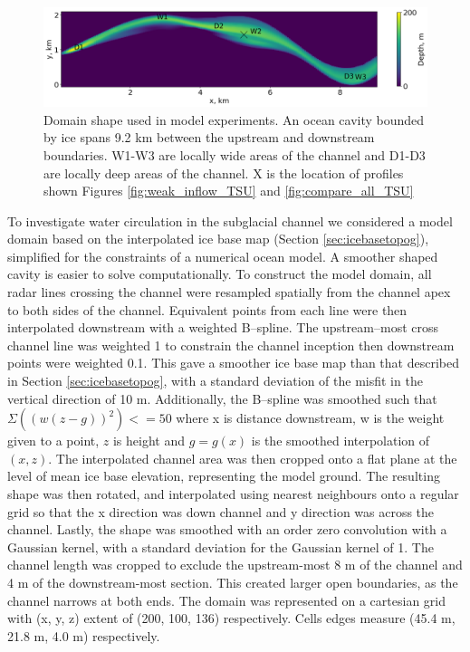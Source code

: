 \begin{figure}[!ht]
\centering
\includegraphics[width=1\textwidth]{chapters/4/domain.png}
\caption[Domain]{Domain shape used in model experiments. An ocean cavity bounded by ice spans 9.2 km between the upstream and downstream boundaries. W1-W3 are locally wide areas of the channel and D1-D3 are locally deep areas of the channel. X is the location of profiles shown Figures \ref{fig:weak_inflow_TSU} and \ref{fig:compare_all_TSU} }
\label{fig:domain}
\end{figure}

To investigate water circulation in the subglacial channel we considered a model domain based on the interpolated ice base map (Section \ref{sec:icebasetopog}), simplified for the constraints of a numerical ocean model.  A smoother shaped cavity is easier to solve computationally.
To construct the model domain, all radar lines crossing the channel were resampled spatially from the channel apex to both sides of the channel. Equivalent points from each line were then interpolated downstream with a weighted B--spline. The upstream--most cross channel line was weighted 1 to constrain the channel inception then downstream points were weighted 0.1. This gave a smoother ice base map than that described in Section \ref{sec:icebasetopog}, with a standard deviation of the misfit in the vertical direction of 10 m.  Additionally, the B--spline was smoothed such that $ \Sigma ((w  (z - g))^2) <= 50 $ where x is distance downstream, w is the weight given to a point, $z$ is height and $g=g(x)$ is the smoothed interpolation of $(x,z)$.
The interpolated channel area was then cropped onto a flat plane at the level of mean ice base elevation, representing the model ground. The resulting shape was then rotated, and interpolated using nearest neighbours onto a regular grid so that the x direction was down channel and y direction was across the channel. Lastly, the shape was smoothed with an order zero convolution with a Gaussian kernel, with a standard deviation for the Gaussian kernel of 1.
The channel length was cropped to exclude the upstream-most 8 m of the channel and 4 m of the downstream-most section. This created larger open boundaries, as the channel narrows at both ends.
The domain was represented on a cartesian grid with (x, y, z) extent of (200, 100, 136) respectively. Cells edges measure (45.4 m, 21.8 m, 4.0 m)  respectively.

